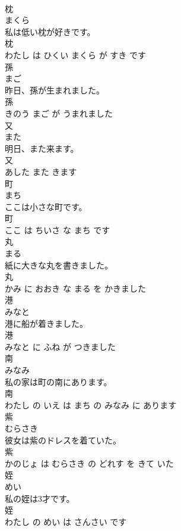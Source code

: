 \documentclass[8pt]{extreport}
\begin{document}
\begin{CJK}{UTF8}{min}
\\	枕	
\\	まくら			
\\	私は低い枕が好きです。	
\\	枕 
\\	わたし は ひくい まくら が すき です			
\\	孫	
\\	まご			
\\	昨日、孫が生まれました。	
\\	孫 
\\	きのう まご が うまれました			
\\	又	
\\	また			
\\	明日、また来ます。	
\\	又 
\\	あした また きます			
\\	町	
\\	まち			
\\	ここは小さな町です。	
\\	町 
\\	ここ は ちいさ な まち です			
\\	丸	
\\	まる			
\\	紙に大きな丸を書きました。	
\\	丸 
\\	かみ に おおき な まる を かきました			
\\	港	
\\	みなと			
\\	港に船が着きました。	
\\	港 
\\	みなと に ふね が つきました			
\\	南	
\\	みなみ			
\\	私の家は町の南にあります。	
\\	南 
\\	わたし の いえ は まち の みなみ に あります			
\\	紫	
\\	むらさき			
\\	彼女は紫のドレスを着ていた。	
\\	紫 
\\	かのじょ は むらさき の どれす を きて いた			
\\	姪	
\\	めい			
\\	私の姪は3才です。	
\\	姪 
\\	わたし の めい は さんさい です			

\end{CJK}
\end{document}
